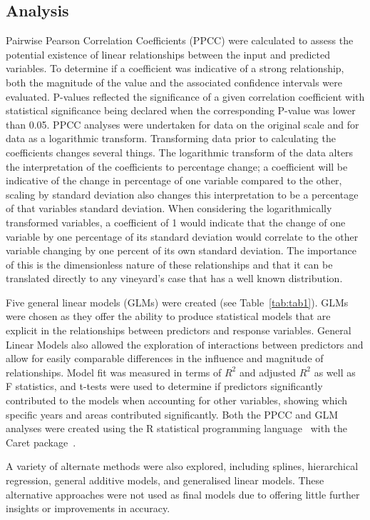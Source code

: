 \documentclass[10pt,letterpaper]{article}
\begin{document}
\subsection*{Analysis}
Pairwise Pearson Correlation Coefficients (PPCC) were calculated to assess the potential existence of linear relationships between the input and predicted variables. To determine if a coefficient was indicative of a strong relationship, both the magnitude of the value and the associated confidence intervals were evaluated. P-values reflected the significance of a given correlation coefficient with statistical significance being declared when the corresponding P-value was lower than 0.05. PPCC analyses were undertaken for data on the original scale and for data as a logarithmic transform. Transforming data prior to calculating the coefficients changes several things. The logarithmic transform of the data alters the interpretation of the coefficients to percentage change; a coefficient will be indicative of the change in percentage of one variable compared to the other, scaling by standard deviation also changes this interpretation to be a percentage of that variables standard deviation. When considering the logarithmically transformed variables, a coefficient of 1 would indicate that the change of one variable by one percentage of its standard deviation would correlate to the other variable changing by one percent of its own standard deviation. The importance of this is the dimensionless nature of these relationships and that it can be translated directly to any vineyard's case that has a well known distribution.
\par
Five general linear models (GLMs) were created (see Table~\ref{tab:tab1}). GLMs were chosen as they offer the ability to produce statistical models that are explicit in the relationships between predictors and response variables.  General Linear Models also allowed the exploration of interactions between predictors and allow for easily comparable differences in the influence and magnitude of relationships. Model fit was measured in terms of $R^2$ and adjusted $R^2$ as well as F statistics, and t-tests were used to determine if predictors significantly contributed to the models when accounting for other variables, showing which specific years and areas contributed significantly. Both the PPCC and GLM analyses were created using the R statistical programming language~\cite{rcoreteamLanguageEnvironmentStatistical2021} with the Caret package~\cite{kuhnBuildingPredictiveModels2008}. 
\par
A variety of alternate methods were also explored, including splines, hierarchical regression, general additive models, and generalised linear models. These alternative approaches were not used as final models due to offering little further insights or improvements in accuracy.
\par
\end{document}
